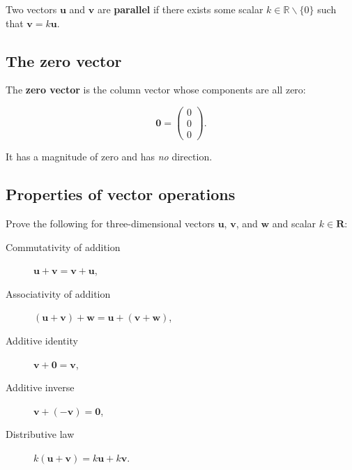 \documentclass[a4paper,12pt]{amsart}
\begin{document}
    Two vectors $\mathbf{u}$ and $\mathbf{v}$ are \textbf{parallel} if there exists some scalar $k \in \mathbb{R} \backslash \{ 0 \}$ such that $\mathbf{v} = k \mathbf{u}$.

    \subsection{The zero vector}

    The \textbf{zero vector} is the column vector whose components are all zero:

    \[ \mathbf{0} = \begin{pmatrix} 0 \\ 0 \\ 0 \end{pmatrix}. \]

    It has a magnitude of zero and has \emph{no} direction.

    \subsection{Properties of vector operations}

    Prove the following for three-dimensional vectors $\mathbf{u}$, $\mathbf{v}$, and $\mathbf{w}$ and scalar $k \in \mathbf{R}$:

    \begin{description}
        \item[Commutativity of addition] $\mathbf{u} + \mathbf{v} = \mathbf{v} + \mathbf{u}$,
        \item[Associativity of addition] $(\mathbf{u} + \mathbf{v}) + \mathbf{w} = \mathbf{u} + (\mathbf{v} + \mathbf{w})$,
        \item[Additive identity] $\mathbf{v} + \mathbf{0} = \mathbf{v}$,
        \item[Additive inverse] $\mathbf{v} + (-\mathbf{v}) = \mathbf{0}$,
        \item[Distributive law] $k (\mathbf{u} + \mathbf{v}) = k \mathbf{u} + k \mathbf{v}$.
    \end{description}
\end{document}
